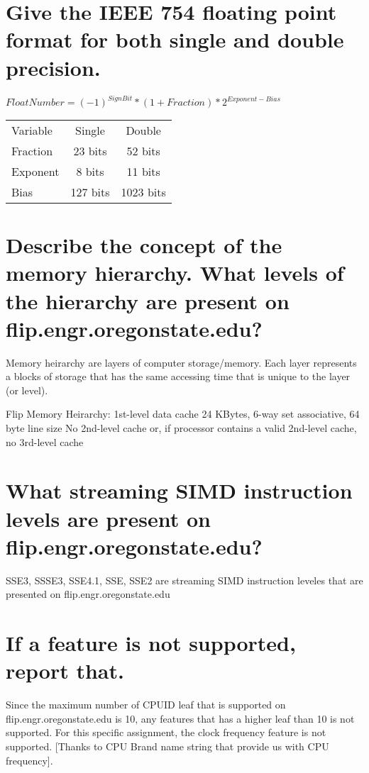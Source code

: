 \documentclass[letterpaper,10pt,titlepage,fleqn]{article}
\begin{document}
\section*{Give the IEEE 754 floating point format for both single and double precision.}

\begin{center}
   $ Float Number = (-1)^{SignBit} * (1 + Fraction) * 2^{Exponent - Bias}  $

\begin{tabular} { l | c | c }
   Variable & Single  & Double\\
   Fraction & 23 bits & 52 bits\\ 
   Exponent & 8 bits  & 11 bits\\
   Bias     & 127 bits& 1023 bits \\

\end{tabular}
\end{center}

\section*{Describe the concept of the memory hierarchy. What levels of the hierarchy are present on flip.engr.oregonstate.edu?}

Memory heirarchy are layers of computer storage/memory. Each layer represents a blocks of storage that has the same accessing time that is unique to the layer (or level). \newline

Flip Memory Heirarchy:\newline
1st-level data cache  24 KBytes, 6-way set associative, 64 byte line size\newline
 No 2nd-level cache or, if processor contains a valid 2nd-level cache, no 3rd-level cache
 

\section*{What streaming SIMD instruction levels are present on flip.engr.oregonstate.edu?}

SSE3, SSSE3, SSE4.1, SSE, SSE2 are streaming SIMD instruction leveles that are presented on flip.engr.oregonstate.edu  

\section*{If a feature is not supported, report that.}

Since the maximum number of CPUID leaf that is supported on flip.engr.oregonstate.edu is 10, any features that has a higher leaf than 10 is not supported. For this specific assignment, the clock frequency feature is not supported. [Thanks to CPU Brand name string that provide us with CPU frequency].
\end{document}
